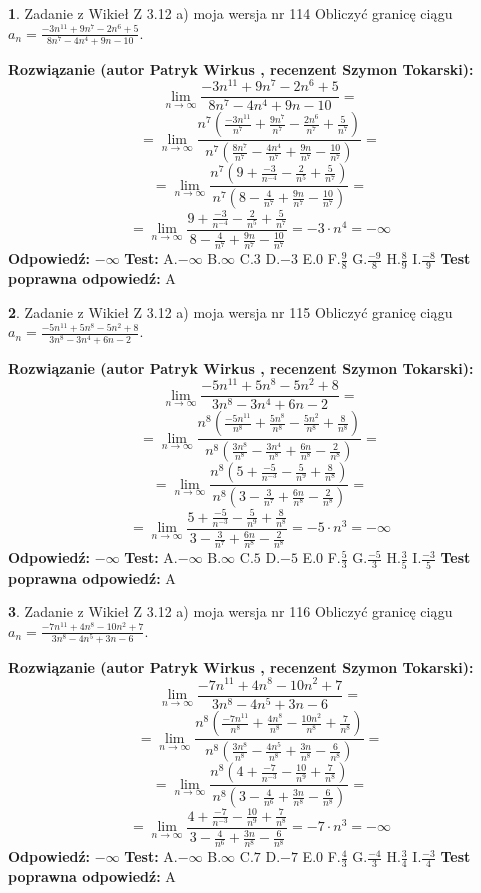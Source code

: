 \documentclass[12pt, a4paper]{article}
\theoremstyle{definition} %
\newtheorem{zad}{}
\newcommand{\zadStart}[1]{\begin{zad}#1\newline}
\newcommand{\zadStop}{\end{zad}}
\newcommand{\rozwStart}[2]{\noindent \textbf{Rozwiązanie (autor #1 , recenzent #2): }\newline}
\newcommand{\rozwStop}{\newline}
\newcommand{\odpStart}{\noindent \textbf{Odpowiedź:}\newline}
\newcommand{\odpStop}{\newline}
\newcommand{\testStart}{\noindent \textbf{Test:}\newline}
\newcommand{\testStop}{\newline}
\newcommand{\kluczStart}{\noindent \textbf{Test poprawna odpowiedź:}\newline}
\newcommand{\kluczStop}{\newline}
\begin{document}
\zadStart{Zadanie z Wikieł Z 3.12 a) moja wersja nr 114}
Obliczyć granicę ciągu $a_{n}=\frac{-3n^{11}+9n^{7}-2n^{6}+5}{8n^{7}-4n^{4}+9n-10}$.
\zadStop
\rozwStart{Patryk Wirkus}{Szymon Tokarski}
$$\lim\limits_{n\to\infty}\frac{-3n^{11}+9n^{7}-2n^{6}+5}{8n^{7}-4n^{4}+9n-10}=$$
$$=\lim\limits_{n\to\infty}\frac{n^{7}\left(\frac{-3n^{11}}{n^{7}}+\frac{9n^{7}}{n^{7}}-\frac{2n^{6}}{n^{7}}+\frac{5}{n^{7}}\right)}{n^{7}\left(\frac{8n^{7}}{n^{7}}-\frac{4n^{4}}{n^{7}}+\frac{9n}{n^{7}}-\frac{10}{n^{7}}\right)}=$$
$$=\lim\limits_{n\to\infty}\frac{n^{7}\left(9+\frac{-3}{n^{-4}}-\frac{2}{n^{5}}+\frac{5}{n^{7}}\right)}
{n^{7}\left(8-\frac{4}{n^{7}}+\frac{9n}{n^{7}}-\frac{10}{n^{7}}\right)}=$$
$$=\lim\limits_{n\to\infty}\frac{9+\frac{-3}{n^{-4}}-\frac{2}{n^{5}}+\frac{5}{n^{7}}}{8-\frac{4}{n^{7}}+\frac{9n}{n^{7}}-\frac{10}{n^{7}}}=-3\cdot n^{4} = -\infty$$
\rozwStop
\odpStart
$-\infty$
\odpStop
\testStart
A.$-\infty$
B.$\infty$
C.$3$
D.$-3$
E.$0$
F.$\frac{9}{8}$
G.$\frac{-9}{8}$
H.$\frac{8}{9}$
I.$\frac{-8}{9}$
\testStop
\kluczStart
A
\kluczStop



\zadStart{Zadanie z Wikieł Z 3.12 a) moja wersja nr 115}
Obliczyć granicę ciągu $a_{n}=\frac{-5n^{11}+5n^{8}-5n^{2}+8}{3n^{8}-3n^{4}+6n-2}$.
\zadStop
\rozwStart{Patryk Wirkus}{Szymon Tokarski}
$$\lim\limits_{n\to\infty}\frac{-5n^{11}+5n^{8}-5n^{2}+8}{3n^{8}-3n^{4}+6n-2}=$$
$$=\lim\limits_{n\to\infty}\frac{n^{8}\left(\frac{-5n^{11}}{n^{8}}+\frac{5n^{8}}{n^{8}}-\frac{5n^{2}}{n^{8}}+\frac{8}{n^{8}}\right)}{n^{8}\left(\frac{3n^{8}}{n^{8}}-\frac{3n^{4}}{n^{8}}+\frac{6n}{n^{8}}-\frac{2}{n^{8}}\right)}=$$
$$=\lim\limits_{n\to\infty}\frac{n^{8}\left(5+\frac{-5}{n^{-3}}-\frac{5}{n^{9}}+\frac{8}{n^{8}}\right)}
{n^{8}\left(3-\frac{3}{n^{7}}+\frac{6n}{n^{8}}-\frac{2}{n^{8}}\right)}=$$
$$=\lim\limits_{n\to\infty}\frac{5+\frac{-5}{n^{-3}}-\frac{5}{n^{9}}+\frac{8}{n^{8}}}{3-\frac{3}{n^{7}}+\frac{6n}{n^{8}}-\frac{2}{n^{8}}}=-5\cdot n^{3} = -\infty$$
\rozwStop
\odpStart
$-\infty$
\odpStop
\testStart
A.$-\infty$
B.$\infty$
C.$5$
D.$-5$
E.$0$
F.$\frac{5}{3}$
G.$\frac{-5}{3}$
H.$\frac{3}{5}$
I.$\frac{-3}{5}$
\testStop
\kluczStart
A
\kluczStop



\zadStart{Zadanie z Wikieł Z 3.12 a) moja wersja nr 116}
Obliczyć granicę ciągu $a_{n}=\frac{-7n^{11}+4n^{8}-10n^{2}+7}{3n^{8}-4n^{5}+3n-6}$.
\zadStop
\rozwStart{Patryk Wirkus}{Szymon Tokarski}
$$\lim\limits_{n\to\infty}\frac{-7n^{11}+4n^{8}-10n^{2}+7}{3n^{8}-4n^{5}+3n-6}=$$
$$=\lim\limits_{n\to\infty}\frac{n^{8}\left(\frac{-7n^{11}}{n^{8}}+\frac{4n^{8}}{n^{8}}-\frac{10n^{2}}{n^{8}}+\frac{7}{n^{8}}\right)}{n^{8}\left(\frac{3n^{8}}{n^{8}}-\frac{4n^{5}}{n^{8}}+\frac{3n}{n^{8}}-\frac{6}{n^{8}}\right)}=$$
$$=\lim\limits_{n\to\infty}\frac{n^{8}\left(4+\frac{-7}{n^{-3}}-\frac{10}{n^{9}}+\frac{7}{n^{8}}\right)}
{n^{8}\left(3-\frac{4}{n^{6}}+\frac{3n}{n^{8}}-\frac{6}{n^{8}}\right)}=$$
$$=\lim\limits_{n\to\infty}\frac{4+\frac{-7}{n^{-3}}-\frac{10}{n^{9}}+\frac{7}{n^{8}}}{3-\frac{4}{n^{6}}+\frac{3n}{n^{8}}-\frac{6}{n^{8}}}=-7\cdot n^{3} = -\infty$$
\rozwStop
\odpStart
$-\infty$
\odpStop
\testStart
A.$-\infty$
B.$\infty$
C.$7$
D.$-7$
E.$0$
F.$\frac{4}{3}$
G.$\frac{-4}{3}$
H.$\frac{3}{4}$
I.$\frac{-3}{4}$
\testStop
\kluczStart
A
\kluczStop
\end{document}
